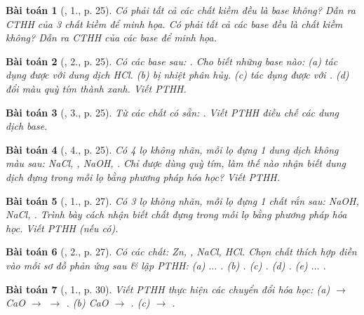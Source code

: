 \documentclass{article}
\newtheorem{baitoan}{Bài toán}
\begin{document}
\begin{baitoan}[\cite{SGK_Hoa_Hoc_9}, 1., p. 25]
	Có phải tất cả các chất kiềm đều là base không? Dẫn ra CTHH của 3 chất kiềm để minh họa. Có phải tất cả các base đều là chất kiềm không? Dẫn ra CTHH của các base để minh họa.
\end{baitoan}

\begin{baitoan}[\cite{SGK_Hoa_Hoc_9}, 2., p. 25]
	Có các base sau: {\rm{}}. Cho biết những base nào: (a) tác dụng được với dung dịch {\rm HCl}. (b) bị nhiệt phân hủy. (c) tác dụng được với {\rm{}}. (d) đổi màu quỳ tím thành xanh. Viết {\rm PTHH}.
\end{baitoan}

\begin{baitoan}[\cite{SGK_Hoa_Hoc_9}, 3., p. 25]
	Từ các chất có sẵn: {\rm{}}. Viết {\rm PTHH} điều chế các dung dịch base.
\end{baitoan}

\begin{baitoan}[\cite{SGK_Hoa_Hoc_9}, 4., p. 25]
	Có 4 lọ không nhãn, mỗi lọ đựng 1 dung dịch không màu sau: {\rm NaCl, , NaOH, }. Chỉ được dùng quỳ tím, làm thế nào nhận biết dung dịch đựng trong mỗi lọ bằng phương pháp hóa học? Viết {\rm PTHH}.
\end{baitoan}

\begin{baitoan}[\cite{SGK_Hoa_Hoc_9}, 1., p. 27]
	Có 3 lọ không nhãn, mỗi lọ đựng 1 chất rắn sau: {\rm NaOH, NaCl, }. Trình bày cách nhận biết chất đựng trong mỗi lọ bằng phương pháp hóa học. Viết {\rm PTHH} (nếu có).
\end{baitoan}

\begin{baitoan}[\cite{SGK_Hoa_Hoc_9}, 2., p. 27]
	Có các chất: {\rm Zn, , NaCl, HCl}. Chọn chất thích hợp điền vào mỗi sơ đồ phản ứng sau \& lập PTHH: {\rm(a) $\ldots$ . (b) . (c) . (d) . (e) $\ldots$ }.
\end{baitoan}

\begin{baitoan}[\cite{SGK_Hoa_Hoc_9}, 1., p. 30]
	Viết {\rm PTHH} thực hiện các chuyển đổi hóa học: (a) {\rm{} $\to$ CaO $\to$  $\to$ }. (b) {\rm CaO $\to$ }. (c) {\rm{} $\to$ }.
\end{baitoan}
\end{document}
